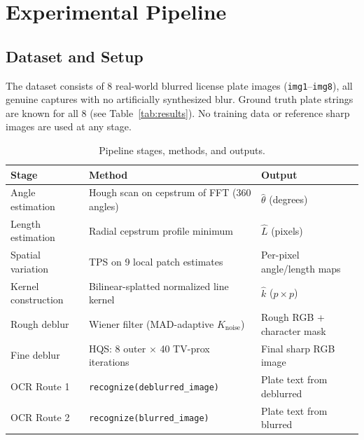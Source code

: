 \documentclass[12pt,a4paper]{article}
\begin{document}
\section{Experimental Pipeline}

\subsection{Dataset and Setup}

The dataset consists of 8 real-world blurred license plate images (\texttt{img1}--\texttt{img8}),
all genuine captures with no artificially synthesized blur. Ground truth plate strings are
known for all 8 (see Table~\ref{tab:results}). No training data or reference sharp images
are used at any stage.

\begin{table}[H]
  \centering
  \caption{Pipeline stages, methods, and outputs.}
  \label{tab:pipeline}
  \small
  \begin{tabular}{@{}lll@{}}
    \toprule
    \textbf{Stage} & \textbf{Method} & \textbf{Output} \\
    \midrule
    Angle estimation    & Hough scan on cepstrum of FFT (360 angles)       & $\hat{\theta}$ (degrees) \\
    Length estimation   & Radial cepstrum profile minimum                  & $\hat{L}$ (pixels) \\
    Spatial variation   & TPS on 9 local patch estimates                   & Per-pixel angle/length maps \\
    Kernel construction & Bilinear-splatted normalized line kernel          & $\hat{k}$ ($p{\times}p$) \\
    Rough deblur        & Wiener filter (MAD-adaptive $K_{\mathrm{noise}}$) & Rough RGB + character mask \\
    Fine deblur         & HQS: 8 outer $\times$ 40 TV-prox iterations      & Final sharp RGB image \\
    OCR Route 1         & \texttt{recognize(deblurred\_image)}             & Plate text from deblurred \\
    OCR Route 2         & \texttt{recognize(blurred\_image)}               & Plate text from blurred \\
    \bottomrule
  \end{tabular}
\end{table}
\end{document}
